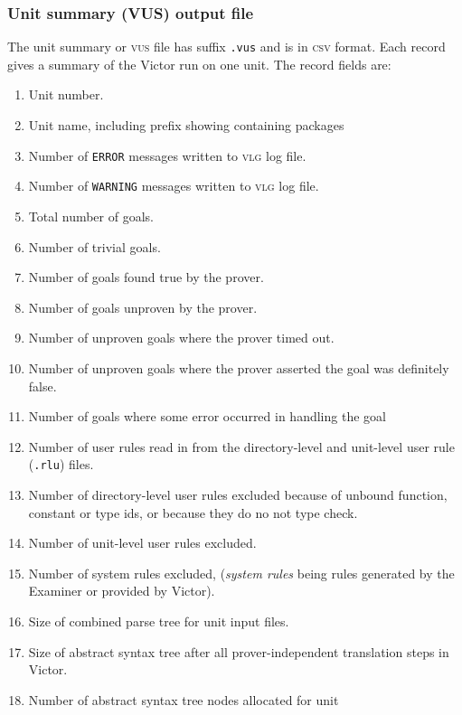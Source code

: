 \documentclass[12pt,fleqn]{article}
\newcommand{\logfile}{\textsc{vlg}}
\newcommand{\unitsumfile}{\textsc{vus}}
\newcommand{\csv}{\textsc{csv}}
\begin{document}
\subsubsection{Unit summary (VUS)  output file}
The unit summary or \unitsumfile{} file has suffix \texttt{.vus} and is
in \csv{} format.
Each record gives a summary of the Victor run on one unit.
The record fields are:
\begin{enumerate}

\item Unit number.
\item Unit name, including prefix showing containing packages

\item Number of \texttt{ERROR} messages written to \logfile{} log file.
\item Number of \texttt{WARNING} messages written to \logfile{} log file.

\item Total number of goals.
\item Number of trivial goals.
\item Number of goals found true by the prover.
\item Number of goals unproven by the prover.
\item Number of unproven goals where the prover timed out.
\item Number of unproven goals where the prover asserted the goal was
  definitely false.
\item Number of goals where some error occurred in handling the goal

\item Number of user rules read in from the directory-level and unit-level
  user rule (\texttt{.rlu}) files.
\item Number of directory-level user rules excluded because of unbound
  function, constant or type ids, or because they do no not type check.
\item Number of unit-level user rules excluded.
\item Number of system rules excluded, (\emph{system rules} being rules
  generated by the Examiner or provided by Victor).

\item Size of combined parse tree for unit input files.
\item Size of abstract syntax tree after all prover-independent
  translation steps in Victor.
\item Number of abstract syntax tree nodes allocated for unit


\end{enumerate}
\end{document}
